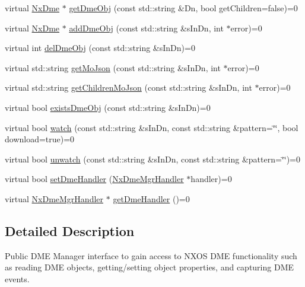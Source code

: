 \begin{DoxyCompactItemize}
\item 
virtual \mbox{\hyperlink{classnxos_1_1_nx_dme}{Nx\+Dme}} $\ast$ \mbox{\hyperlink{classnxos_1_1_nx_dme_mgr_acf4e25cc54e1cb352c9c79bb7dfa4021}{get\+Dme\+Obj}} (const std\+::string \&Dn, bool get\+Children=false)=0
\item 
virtual \mbox{\hyperlink{classnxos_1_1_nx_dme}{Nx\+Dme}} $\ast$ \mbox{\hyperlink{classnxos_1_1_nx_dme_mgr_a9bbf25e6b6565bfef6f81e5d74ba4a9d}{add\+Dme\+Obj}} (const std\+::string \&s\+In\+Dn, int $\ast$error)=0
\item 
virtual int \mbox{\hyperlink{classnxos_1_1_nx_dme_mgr_ae29687ce5a8ac402e1297bb3c8528936}{del\+Dme\+Obj}} (const std\+::string \&s\+In\+Dn)=0
\item 
virtual std\+::string \mbox{\hyperlink{classnxos_1_1_nx_dme_mgr_af0c1e7578c6752294cade91b395ef19c}{get\+Mo\+Json}} (const std\+::string \&s\+In\+Dn, int $\ast$error)=0
\item 
virtual std\+::string \mbox{\hyperlink{classnxos_1_1_nx_dme_mgr_a950c598125c2cc0d739c4a882a65f447}{get\+Children\+Mo\+Json}} (const std\+::string \&s\+In\+Dn, int $\ast$error)=0
\item 
virtual bool \mbox{\hyperlink{classnxos_1_1_nx_dme_mgr_aa21c3fd72667ddbafb2b288e15c89a92}{exists\+Dme\+Obj}} (const std\+::string \&s\+In\+Dn)=0
\item 
virtual bool \mbox{\hyperlink{classnxos_1_1_nx_dme_mgr_a84b7abe8172478474ba83a403be390ae}{watch}} (const std\+::string \&s\+In\+Dn, const std\+::string \&pattern=\char`\"{}\char`\"{}, bool download=true)=0
\item 
virtual bool \mbox{\hyperlink{classnxos_1_1_nx_dme_mgr_a96f2b81fd3c248cb1408c95330ae6962}{unwatch}} (const std\+::string \&s\+In\+Dn, const std\+::string \&pattern=\char`\"{}\char`\"{})=0
\item 
virtual bool \mbox{\hyperlink{classnxos_1_1_nx_dme_mgr_a3d7e9ce8c28586d834f1504856e22988}{set\+Dme\+Handler}} (\mbox{\hyperlink{classnxos_1_1_nx_dme_mgr_handler}{Nx\+Dme\+Mgr\+Handler}} $\ast$handler)=0
\item 
virtual \mbox{\hyperlink{classnxos_1_1_nx_dme_mgr_handler}{Nx\+Dme\+Mgr\+Handler}} $\ast$ \mbox{\hyperlink{classnxos_1_1_nx_dme_mgr_a4eb84500ef136c111650e385c8f29eb6}{get\+Dme\+Handler}} ()=0
\end{DoxyCompactItemize}


\subsection{Detailed Description}
Public D\+ME Manager interface to gain access to N\+X\+OS D\+ME functionality such as reading D\+ME objects, getting/setting object properties, and capturing D\+ME events. 

